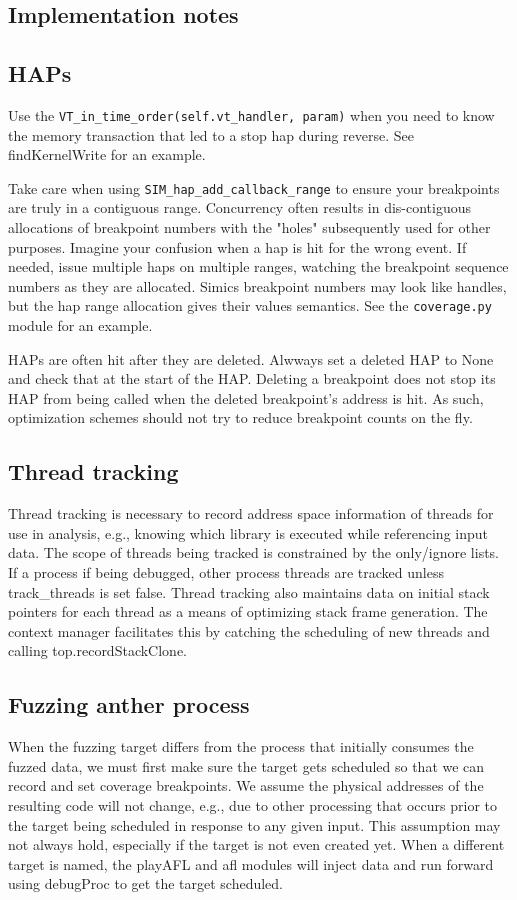 \documentclass[titlepage]{article}
\begin{document}
\begin{appendices}
\section{Implementation notes}
\subsection{HAPs}
Use the {\tt VT\_in\_time\_order(self.vt\_handler, param)} when you need to know the memory transaction that
led to a stop hap during reverse.  See findKernelWrite for an example.

Take care when using {\tt SIM\_hap\_add\_callback\_range} to ensure your breakpoints are truly in a contiguous range.
Concurrency often results in dis-contiguous allocations of breakpoint numbers with the "holes" subsequently used for other purposes.
Imagine your confusion when a hap is hit for the wrong event.  If needed, issue multiple haps on multiple ranges, watching the
breakpoint sequence numbers as they are allocated.  Simics breakpoint numbers may look like handles, but the hap range allocation 
gives their values semantics.  See the {\tt coverage.py} module for an example.

HAPs are often hit after they are deleted.  Alwways set a deleted HAP to None and check that at the start of the HAP.
Deleting a breakpoint does not stop its HAP from being called when the deleted breakpoint's address is hit.  As such,
optimization schemes should not try to reduce breakpoint counts on the fly.

\subsection{Thread tracking}
Thread tracking is necessary to record address space information of threads for use in analysis, e.g., knowing which library
is executed while referencing input data.  The scope of threads being tracked is constrained by the only/ignore lists. 
If a process if being debugged, other process threads are tracked unless track\_threads is set false.  Thread tracking also maintains
data on initial stack pointers for each thread as a means of optimizing stack frame generation.  The context manager facilitates this 
by catching the scheduling of new threads and calling top.recordStackClone.

\subsection{Fuzzing anther process}
When the fuzzing target differs from the process that initially consumes the fuzzed data, we must first make
sure the target gets scheduled so that we can record and set coverage breakpoints.  We assume the physical addresses
of the resulting code will not change, e.g., due to other processing that occurs prior to the target being scheduled
in response to any given input.  This assumption may not always hold, especially if the target is not even created yet.
When a different target is named, the playAFL and afl modules will inject data and run forward using debugProc to get
the target scheduled.


\end{appendices}
\end{document}
